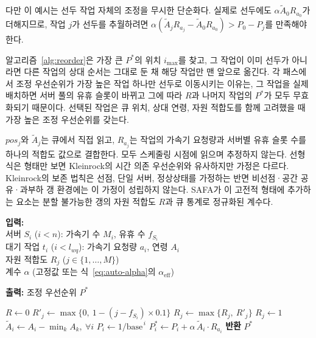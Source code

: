 \documentclass{ieeetj}
\begin{document}
다만 이 예시는 선두 작업 자체의 조정을 무시한 단순화다. 실제로 선두에도 $\alpha\tilde A_0R_{a_0}$가 더해지므로, 작업 $j$가 선두를 추월하려면 $\alpha(\tilde A_jR_{a_j}-\tilde A_0R_{a_0})>P_0-P_j$를 만족해야 한다.

알고리즘~\ref{alg:reorder}은 가장 큰 $P^*$의 위치 $i_{\max}$를 찾고, 그 작업이 이미 선두가 아니라면 다른 작업의 상대 순서는 그대로 둔 채 해당 작업만 맨 앞으로 옮긴다. 각 패스에서 조정 우선순위가 가장 높은 작업 하나만 선두로 이동시키는 이유는, 그 작업을 실제 배치하면 서버 풀의 유휴 슬롯이 바뀌고 그에 따라 $R$과 나머지 작업의 $P^*$가 모두 무효화되기 때문이다. 선택된 작업은 큐 위치, 상대 연령, 자원 적합도를 함께 고려했을 때 가장 높은 조정 우선순위를 갖는다.

$pos_j$와 $\tilde A_j$는 큐에서 직접 읽고, $R_{a_j}$는 작업의 가속기 요청량과 서버별 유휴 슬롯 수를 하나의 적합도 값으로 결합한다. 모두 스케줄링 시점에 읽으며 추정하지 않는다. 선형식은 형태만 보면 Kleinrock의 시간 의존 우선순위\cite{kleinrock1976queueing}와 유사하지만 가정은 다르다. Kleinrock의 보존 법칙은 선점, 단일 서버, 정상상태를 가정하는 반면 비선점·공간 공유·과부하 갱 환경에는 이 가정이 성립하지 않는다. SAFA가 이 고전적 형태에 추가하는 요소는 분할 불가능한 갱의 자원 적합도 $R$과 큐 통계로 정규화된 계수다.

\begin{algorithm}
\caption{SAFA 조정 우선순위}\label{alg:priority}
\textbf{입력:} \\
\hspace*{4mm} 서버 $S_i$ ($i{<}n$): 가속기 수 $M_i$, 유휴 수 $f_{S_i}$ \\
\hspace*{4mm} 대기 작업 $t_i$ ($i{<}l_{wq}$): 가속기 요청량 $a_i$, 연령 $A_i$ \\
\hspace*{4mm} 자원 적합도 $R_j$ ($j\in\{1,\ldots,M\}$) \\
\hspace*{4mm} 계수 $\alpha$ (고정값 또는 식~\eqref{eq:auto-alpha}의 $\alpha_{\text{eff}}$)
\begin{flushleft}
\textbf{출력:} 조정 우선순위 $P^*$
\end{flushleft}
\begin{algorithmic}[1]
\STATE $R \gets 0$
\STATE {}
            \STATE $R'_j \gets \max\{0,\ 1 - ( j - f_{S_i} ) \times 0.1\}$ 
            \STATE $R_j \gets \max\{R_j,\ R'_j\}$
        \ELSE
            \STATE $R_j \gets 1$ 
        \ENDIF
    \ENDFOR
\ENDFOR
\STATE {}
\STATE $\tilde A_i \gets A_i - \min_k A_k,\ \forall i$ 
    \STATE $P_i \gets 1/\text{base}^{\,i}$
    \STATE $P_i^* \gets P_i + \alpha\, \tilde A_i \cdot R_{a_i}$
\ENDFOR
\STATE \textbf{반환} $P^*$
\end{algorithmic}
\end{algorithm}
\end{document}

